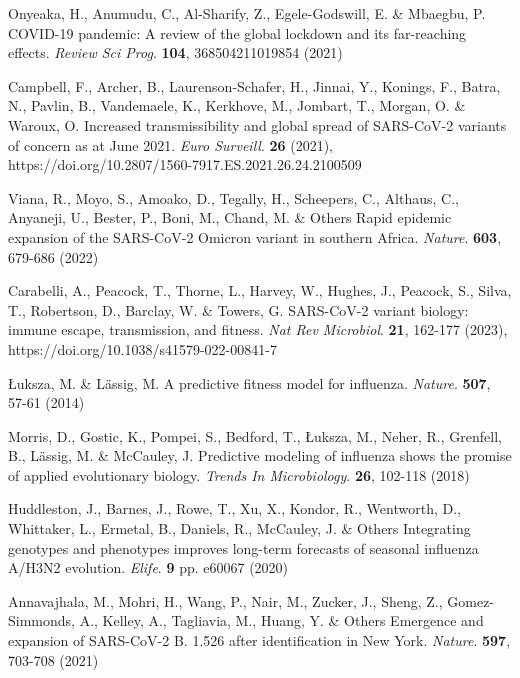 \documentclass[10pt,letterpaper]{article}
\begin{document}
\begin{thebibliography}{10}

Onyeaka, H., Anumudu, C., Al-Sharify, Z., Egele-Godswill, E. \& Mbaegbu, P. COVID-19 pandemic: A review of the global lockdown and its far-reaching effects. {\em Review Sci Prog}. \textbf{104}, 368504211019854 (2021)

Campbell, F., Archer, B., Laurenson-Schafer, H., Jinnai, Y., Konings, F., Batra, N., Pavlin, B., Vandemaele, K., Kerkhove, M., Jombart, T., Morgan, O. \& Waroux, O. Increased transmissibility and global spread of SARS-CoV-2 variants of concern as at June 2021. {\em Euro Surveill}. \textbf{26} (2021), https://doi.org/10.2807/1560-7917.ES.2021.26.24.2100509

Viana, R., Moyo, S., Amoako, D., Tegally, H., Scheepers, C., Althaus, C., Anyaneji, U., Bester, P., Boni, M., Chand, M. \& Others Rapid epidemic expansion of the SARS-CoV-2 Omicron variant in southern Africa. {\em Nature}. \textbf{603}, 679-686 (2022)

Carabelli, A., Peacock, T., Thorne, L., Harvey, W., Hughes, J., Peacock, S., Silva, T., Robertson, D., Barclay, W. \& Towers, G. SARS-CoV-2 variant biology: immune escape, transmission, and fitness. {\em Nat Rev Microbiol}. \textbf{21}, 162-177 (2023), https://doi.org/10.1038/s41579-022-00841-7

Łuksza, M. \& Lässig, M. A predictive fitness model for influenza. {\em Nature}. \textbf{507}, 57-61 (2014)

Morris, D., Gostic, K., Pompei, S., Bedford, T., Łuksza, M., Neher, R., Grenfell, B., Lässig, M. \& McCauley, J. Predictive modeling of influenza shows the promise of applied evolutionary biology. {\em Trends In Microbiology}. \textbf{26}, 102-118 (2018)

Huddleston, J., Barnes, J., Rowe, T., Xu, X., Kondor, R., Wentworth, D., Whittaker, L., Ermetal, B., Daniels, R., McCauley, J. \& Others Integrating genotypes and phenotypes improves long-term forecasts of seasonal influenza A/H3N2 evolution. {\em Elife}. \textbf{9} pp. e60067 (2020)

Annavajhala, M., Mohri, H., Wang, P., Nair, M., Zucker, J., Sheng, Z., Gomez-Simmonds, A., Kelley, A., Tagliavia, M., Huang, Y. \& Others Emergence and expansion of SARS-CoV-2 B. 1.526 after identification in New York. {\em Nature}. \textbf{597}, 703-708 (2021)


\end{thebibliography}
\end{document}
